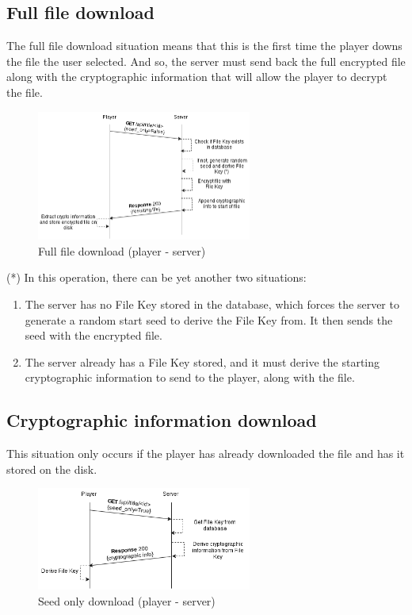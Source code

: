 \documentclass[11pt,a4paper]{report}
\begin{document}
\subsection{Full file download}
The full file download situation means that this is the first time the player downs the file the user selected.
And so, the server must send back the full encrypted file along with the cryptographic information that will allow the player to decrypt the file.

\begin{figure}[H]
\centerline{\includegraphics[width=200pt]{images/fullFileDown.png}}
\caption{Full file download (player - server)}
\label{player}
\end{figure}

(*) In this operation, there can be yet another two situations:

\begin{enumerate}
  \item The server has no File Key stored in the database, which forces the server to generate a random start seed to derive the File Key from. It then sends the seed with the encrypted file.
  \item The server already has a File Key stored, and it must derive the starting cryptographic information to send to the player, along with the file.
\end{enumerate}

\subsection{Cryptographic information download}
This situation only occurs if the player has already downloaded the file and has it stored on the disk.

\begin{figure}[H]
\centerline{\includegraphics[width=200pt]{images/seedOnlyDown.png}}
\caption{Seed only download (player - server)}
\label{player}
\end{figure}
\end{document}
